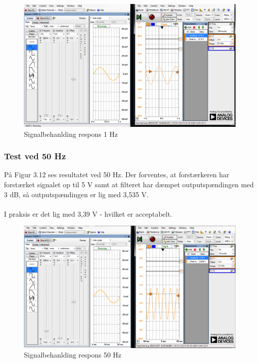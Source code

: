 \begin{figure}[H]
	\centering
	\includegraphics[width=1\textwidth]{Figurer/Snip20151207_42}	\caption{Signalbehanlding respons 1 Hz}
	\label{fig:Signalbehanlding}
\end{figure}

\subsubsection{Test ved 50 Hz}
På Figur 3.12 ses resultatet ved 50 Hz. Der forventes, at forstærkeren har forstærket signalet op til 5 V samt at filteret har dæmpet outputspændingen med 3 dB, så outputspændingen er lig med 3,535 V. 
\\ \\
I praksis er det lig med 3,39 V - hvilket er acceptabelt.    
  

\begin{figure}[H]
	\centering
	\includegraphics[width=1\textwidth]{Figurer/Snip20151207_43}
	\caption{Signalbehanlding respons 50 Hz}
	\label{fig:Signalbehanlding}
\end{figure}

